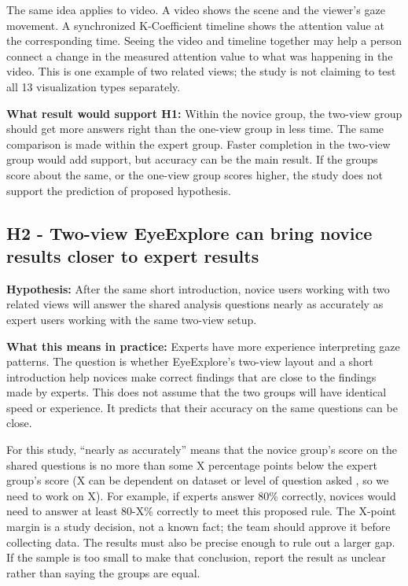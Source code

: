\documentclass[11pt]{article}
\begin{document}
The same idea applies to video. A video shows the scene and the viewer's gaze
movement. A synchronized K-Coefficient timeline shows the attention value at
the corresponding time. Seeing the video and timeline together may help a
person connect a change in the measured attention value to what was happening
in the video. This is one example of two related views; the study is not
claiming to test all 13 visualization types separately.

\textbf{What result would support H1:} Within the novice group, the two-view
group should get more answers right than the one-view group in less time. The same
comparison is made within the expert group. Faster completion in the two-view
group would add support, but accuracy can be the main result. If the groups score
about the same, or the one-view group scores higher, the study does not support
the prediction of proposed hypothesis.

\subsection*{H2 - Two-view EyeExplore can bring novice results closer to expert results}
\textbf{Hypothesis:} After the same short introduction, novice users working
with two related views will answer the shared analysis questions nearly as
accurately as expert users working with the same two-view setup.

\textbf{What this means in practice:} Experts have more experience interpreting
gaze patterns. The question is whether EyeExplore's two-view layout and a short
introduction help novices make correct findings that are close to the findings
made by experts. This does not assume that the two groups will have identical
speed or experience. It predicts that their accuracy on the same questions can
be close.

For this study, ``nearly as accurately'' means that the novice group's score on
the shared questions is no more than some X percentage points below the expert
group's score (X can be dependent on dataset or level of question asked , so we need to work on X). For example, if experts answer 80\% correctly, novices would
need to answer at least 80-X\% correctly to meet this proposed rule. The X-point
margin is a study decision, not a known fact; the team should approve it before
collecting data. The results must also be precise enough to rule out a larger
gap. If the sample is too small to make that conclusion, report the result as
unclear rather than saying the groups are equal.
\end{document}
